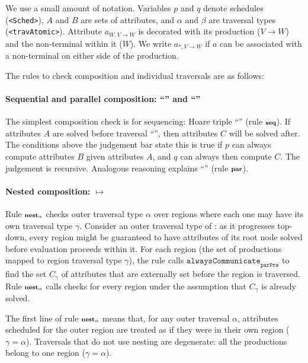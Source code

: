 We use a small amount of notation. Variables $p$ and $q$ denote schedules (\lstinline{<Sched>}), $A$ and $B$ are sets of attributes, and $\alpha$ and $\beta$ are traversal types (\lstinline{<travAtomic>}). Attribute $a_{W, V{\rightarrow}W}$ is decorated with its production ($V{\rightarrow}W$) and the non-terminal within it ($W$). We write  $a_{*, V{\rightarrow}W}$ if $a$ can be associated with a non-terminal on either side of the production.

The rules to check composition and individual traversals are as follows:

\paragraph*{Sequential and parallel composition: ``\sched{;}'' and ``\sched{||}''}The simplest composition check is for sequencing: Hoare triple ``'' (rule ${\scriptstyle\textbf {seq}}$).  If attributes $A$ are solved before traversal ``'', then attributes $C$ will be solved after. The conditions above the judgement bar state this is true if $p$ can always compute attributes $B$ given attributes $A$, and $q$ can always then compute $C$. The judgement is recursive. Analogous reasoning explains  ``\sched{||}'' (rule ${\scriptstyle\textbf {par}}$).


\paragraph*{Nested composition: $\mapsto$}
Rule ${\scriptstyle\textbf {nest}_\alpha}$ checks outer traversal type $\alpha$ over regions where each one may have its own traversal type $\gamma$. Consider an outer traversal type of  : as it progresses top-down, every region might be guaranteed to have attributes of its root node solved before evaluation proceeds within it. For each region (the set of productions mapped to region traversal type $\gamma$), the rule calls $\texttt{alwaysCommunicate}_{\texttt{parPre}}$ to find the set $C_\gamma$ of  attributes that are externally set before the region is traversed. Rule ${\scriptstyle\textbf {nest}_\alpha}$ calls checks for every region under the assumption that $C_\gamma$ is already solved.

The first line of rule ${\scriptstyle\textbf {nest}_\alpha}$ means that, for any outer traversal $\alpha$, attributes scheduled for the outer region are  treated as if they were in their own region ($\gamma = \alpha$). Traversals that do not use nesting are degenerate:  all the productions belong to one region ($\gamma = \alpha$).

